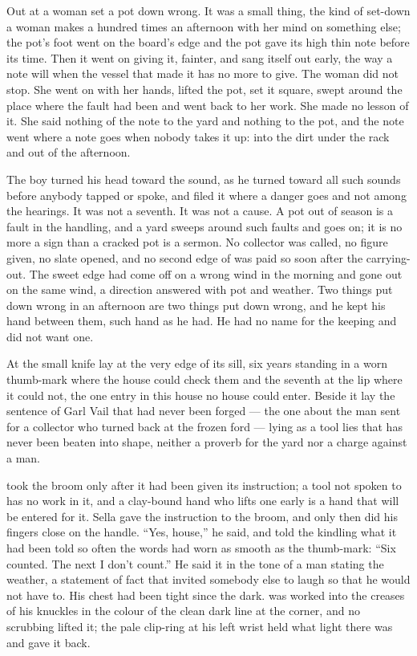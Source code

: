 \scenebreak

Out at  a woman set a pot down wrong. It was a small thing, the kind of set-down a woman makes a hundred times an afternoon with her mind on something else; the pot's foot went on the board's edge and the pot gave its high thin note before its time. Then it went on giving it, fainter, and sang itself out early, the way a note will when the vessel that made it has no more to give. The woman did not stop. She went on with her hands, lifted the pot, set it square, swept around the place where the fault had been and went back to her work. She made no lesson of it. She said nothing of the note to the yard and nothing to the pot, and the note went where a note goes when nobody takes it up: into the dirt under the rack and out of the afternoon.

The boy turned his head toward the sound, as he turned toward all such sounds before anybody tapped or spoke, and filed it where a danger goes and not among the hearings. It was not a seventh. It was not a cause. A pot out of season is a fault in the handling, and a yard sweeps around such faults and goes on; it is no more a sign than a cracked pot is a sermon. No collector was called, no figure given, no slate opened, and no second edge of  was paid so soon after the carrying-out. The sweet edge had come off  on a wrong wind in the morning and gone out on the same wind, a direction answered with pot and weather. Two things put down wrong in an afternoon are two things put down wrong, and he kept his hand between them, such hand as he had. He had no name for the keeping and did not want one.

\scenebreak

At  the small knife lay at the very edge of its sill, six years standing in a worn thumb-mark where the house could check them and the seventh at the lip where it could not, the one entry in this house no house could enter. Beside it lay the sentence of Garl Vail that had never been forged --- the one about the man sent for a collector who turned back at the frozen ford --- lying as a tool lies that has never been beaten into shape, neither a proverb for the yard nor a charge against a man.

 took the broom only after it had been given its instruction; a tool not spoken to has no work in it, and a clay-bound hand who lifts one early is a hand that will be entered for it. Sella gave the instruction to the broom, and only then did his fingers close on the handle. “Yes, house,” he said, and told the kindling what it had been told so often the words had worn as smooth as the thumb-mark: “Six counted. The next I don't count.” He said it in the tone of a man stating the weather, a statement of fact that invited somebody else to laugh so that he would not have to. His chest had been tight since the dark.  was worked into the creases of his knuckles in the colour of the clean dark line at the corner, and no scrubbing lifted it; the pale clip-ring at his left wrist held what light there was and gave it back.

